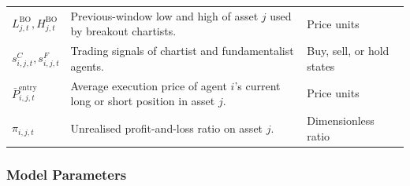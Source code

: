 \documentclass[12pt, a4paper]{article}
\begin{document}
\begin{longtable}{@{}L{0.22\textwidth}L{0.50\textwidth}L{0.20\textwidth}@{}}
        \(L_{j,t}^{\mathrm{BO}},H_{j,t}^{\mathrm{BO}}\) & Previous-window low and high of asset \(j\) used by breakout chartists. & Price units \\
        \(s_{i,j,t}^{C},s_{i,j,t}^{F}\) & Trading signals of chartist and fundamentalist agents. & Buy, sell, or hold states \\
        \(\bar P_{i,j,t}^{\text{entry}}\) & Average execution price of agent \(i\)'s current long or short position in asset \(j\). & Price units \\
        \(\pi_{i,j,t}\) & Unrealised profit-and-loss ratio on asset \(j\). & Dimensionless ratio \\
        \bottomrule
    \end{longtable}

    \subsubsection*{Model Parameters}
\end{document}
